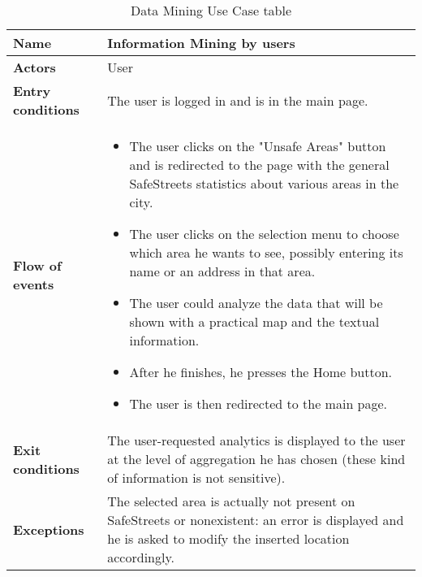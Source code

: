 \begin{table}[!htbp]
	\hypertarget{tab:dataminingtab}{}
	\centering
	\begin{tabular}{lp{9cm}}
\bf\large Name&\bf\large Information Mining by users\\
\hline
\hline
\bf Actors&User\\
\hline
\bf Entry conditions&The user is logged in and is in the main page.\\
\hline
\bf Flow of events&
\begin{itemize}

\item The user clicks on the "Unsafe Areas" button and is redirected to the page with the general SafeStreets statistics about various areas in the city.

\item The user clicks on the selection menu to choose which area he wants to see, possibly entering its name or an address in that area.

\item The user could analyze the data that will be shown with a practical map and the textual information.

\item After he finishes, he presses the Home button.

\item The user is then redirected to the main page.

\end{itemize}
\\
\hline
\bf Exit conditions&The user-requested analytics is displayed to the user at the level of aggregation he has chosen (these kind of information is not sensitive).\\
\hline
\bf Exceptions&The selected area is actually not present on SafeStreets or nonexistent: an error is displayed and he is asked to modify the inserted location accordingly.
\\
\hline

\end{tabular}
\caption{Data Mining Use Case table}
 \label{tab:dataminingtab}
\end{table}